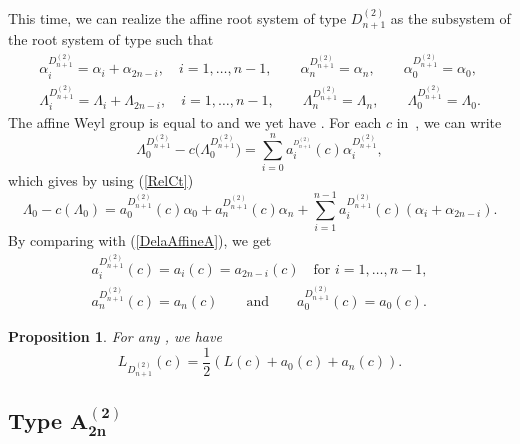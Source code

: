 \documentclass[pdftex]{sigma}
\newtheorem{Proposition}[Theorem]{Proposition}
 { \theoremstyle{definition}
\newtheorem{Definition}[Theorem]{Definition}
\newtheorem{Note}[Theorem]{Note}
\newtheorem{Example}[Theorem]{Example}
\newtheorem{Remark}[Theorem]{Remark} }
\numberwithin{equation}{section}
\begin{document}
\label{sucsecD^2}This time, we can realize the affine root system of type $%
D_{n+1}^{(2)}$ as the subsystem of the root system of type 
such that
\begin{gather}
\alpha _{i}^{D_{n+1}^{(2)}}=\alpha _{i}+\alpha _{2n-i},\quad i=1,\dots ,n-1 ,\qquad
\alpha _{n}^{D_{n+1}^{(2)}}=\alpha _{n} ,\qquad
\alpha _{0}^{D_{n+1}^{(2)}}=\alpha _{0},\nonumber
\\
\Lambda _{i}^{D_{n+1}^{(2)}}=\Lambda _{i}+\Lambda _{2n-i},\quad i=1,\dots ,n-1 ,\qquad
\Lambda _{n}^{D_{n+1}^{(2)}}=\Lambda _{n}, \qquad
\Lambda _{0}^{D_{n+1}^{(2)}}=\Lambda _{0}.
 \label{RelCt}
\end{gather}
The affine Weyl group  is equal to 
and we yet have .
For each $c$ in~, we can write
\begin{equation*}
\Lambda _{0}^{D_{n+1}^{(2)}}-c\bigl(\Lambda
_{0}^{D_{n+1}^{(2)}}\bigr)=\sum_{i=0}^{n}a_{i}^{_{D_{n+1}^{(2)}}}(c)\alpha
_{i}^{D_{n+1}^{(2)}},
\end{equation*}%
which gives by using (\ref{RelCt})%
\begin{equation*}
\Lambda _{0}-c(\Lambda _{0})=a_{0}^{D_{n+1}^{(2)}}(c)\alpha
_{0}+a_{n}^{D_{n+1}^{(2)}}(c)\alpha
_{n}+\sum_{i=1}^{n-1}a_{i}^{D_{n+1}^{(2)}}(c)(\alpha _{i}+\alpha _{2n-i}).
\end{equation*}
By comparing with (\ref{DelaAffineA}), we get
\begin{gather}
a_{i}^{D_{n+1}^{(2)}}(c)=a_{i}(c)=a_{2n-i}(c)\quad \text{for }i=1,\dots ,n-1 ,\nonumber\\
a_{n}^{D_{n+1}^{(2)}}(c)=a_{n}(c)\qquad \text{and}\qquad
a_{0}^{D_{n+1}^{(2)}}(c)=a_{0}(c).
\label{A_i(Dn+1,2)}
\end{gather}

\begin{Proposition}
	\label{Prop_D(n+1,2)}For any , we have
	\begin{equation*}
	L_{D_{n+1}^{(2)}}(c)=\frac{1}{2}(L(c)+a_{0}(c)+a_{n}(c)).
	\end{equation*}
\end{Proposition}

\subsection[Type A\_\{2n\}\^{}(2)]{Type $\boldsymbol{A_{2n}^{(2)}}$}
\label{subsecA(2n,2)}
\end{document}
